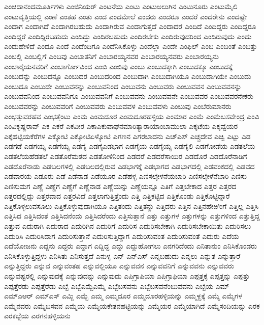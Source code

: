 {ಎಂಚಿದಾನಂದಮೂರ್ತಿಗಳು
ಎಂಜಿನಿಯರ್
ಎಂಟನೆಯ
ಎಂಟು
ಎಂಟುಅಲುಗಿನ
ಎಂಟುನೂರು
ಎಂಟುಮೈಲಿ
ಎಂಟುವೃತ್ತಿಯಲ್ಲಿ
ಎಂಣೆ
ಎಂತಹ
ಎಂತು
ಎಂದ
ಎಂದಮೇಲೆ
ಎಂದರು
ಎಂದರೂ
ಎಂದರೆ
ಎಂದರೇನು
ಎಂದಷ್ಟೇ
ಎಂದಾಗ
ಎಂದಾಗಿದೆ
ಎಂದಾಗಿರಬಹುದು
ಎಂದಾಗಿರುವ
ಎಂದಾಗುತ್ತದೆ
ಎಂದಾದರೆ
ಎಂದಿದೆ
ಎಂದಿದ್ದರು
ಎಂದಿದ್ದರೂ
ಎಂದಿದ್ದರೆ
ಎಂದಿದ್ದಿರಬಹುದು
ಎಂದಿದ್ದು
ಎಂದಿರಬಹುದು
ಎಂದಿರಬೇಕು
ಎಂದಿರುವುದರಿಂದ
ಎಂದಿರುವುದು
ಎಂದು
ಎಂದುಹೇಳಿದೆ
ಎಂದೂ
ಎಂದೆ
ಎಂದೆಂದಿಗೂ
ಎಂದೆನಿಸಿಕೊಳ್ಳು
ಎಂದೆಲ್ಲಾ
ಎಂದೇ
ಎಂಫಿಲ್
ಎಂಬ
ಎಂಬಂತೆ
ಎಂಬತ್ತು
ಎಂಬಲ್ಲಿ
ಎಂಬಲ್ಲಿಗೆ
ಎಂಬವು
ಎಂಬಾತನಿಗೆ
ಎಂಬಾರಯ್ಯನವರ
ಎಂಬಾರಯ್ಯನವರು
ಎಂಬಾರಯ್ಯನು
ಎಂಬಾರೈಯನವರಿಗೆ
ಎಂಬಾರ್ಗೋವಿಂದ
ಎಂಬಿ
ಎಂಬಿವು
ಎಂಬು
ಎಂಬುದಕ್ಕಾಗಿ
ಎಂಬುದಕ್ಕೂ
ಎಂಬುದಕ್ಕೆ
ಎಂಬುದನ್ನು
ಎಂಬುದನ್ನೂ
ಎಂಬುದರ
ಎಂಬುದರಿಂದ
ಎಂಬುದಾಗಿ
ಎಂಬುದಾಗಿಯೂ
ಎಂಬುದಾಗಿಯೇ
ಎಂಬುದು
ಎಂಬುದೂ
ಎಂಬುದೇ
ಎಂಬುವನನ್ನು
ಎಂಬುವನಿಂದ
ಎಂಬುವನು
ಎಂಬುವರು
ಎಂಬುವವನ
ಎಂಬುವವನನ್ನು
ಎಂಬುವವನಿಂದ
ಎಂಬುವವನಿಗೂ
ಎಂಬುವವನಿಗೆ
ಎಂಬುವವನು
ಎಂಬುವವನೇ
ಎಂಬುವವರ
ಎಂಬುವವರನೇಕರು
ಎಂಬುವವರನ್ನು
ಎಂಬುವವರಿಗೆ
ಎಂಬುವವರು
ಎಂಬುವವಳ
ಎಂಬುವವಳು
ಎಂಬುವು
ಎಂಬೆರುಮಾನರು
ಎಂಭತ್ತುವರಹವ
ಎಂಭತ್ತೆಂಟು
ಎಂಮ
ಎಂಮದೂರ
ಎಂಮದೂರಹಳ್ಳಿಯ
ಎಂಮಾರ
ಎಂಮೆ
ಎಂಮೆಬಸವೇಂದ್ರ
ಎಂವಿ
ಎಂವಿಕೃಷ್ಣರಾವ್
ಎಕ
ಎಕರೆ
ಎಕವೀರ
ಎಕಾಎಕುವಾಘನಮಾರಿತ್ಯಾರಾಯಾಂಬಾಮುಲಾ
ಎಕ್ಕಟೆಯ
ಎಕ್ಕವ್ವೆಯರ
ಎಕ್ಕೆಹಟ್ಟಿಯಕೆರೆಗಳ
ಎಕ್ಕೋಟಿ
ಎಕ್ಕೋಟಿಏಳ್ಕೋಟಿ
ಎಗಣನ
ಎಗರಬಾದನು
ಎಚ್ಎಸ್
ಎಚ್ಚದೇವ
ಎಚ್ವಿ
ಎಟ್ಟು
ಎಡ
ಎಡಗಡೆ
ಎಡಗಯ್ಯ
ಎಡಗೆಯ್ಯ
ಎಡಗೈ
ಎಡಗೈಎಡಭಾಗ
ಎಡಗೈಯ
ಎಡಗೈಯ್ಯ
ಎಡಗೈಲಿ
ಎಡಗೋಡೆಯ
ಎಡತಲೆಯ
ಎಡತಲೆಯಹೆಡತಲೆ
ಎಡತೊರೆಮಠದ
ಎಡತೋಳಿನಿಂದ
ಎಡದರೆ
ಎಡದರೆಸಾಯಿರ
ಎಡದೊರೆ
ಎಡದೊರೆನಾಡಿಗೆ
ಎಡದೊರೆನಾಡು
ಎಡಬಲಗಳಲ್ಲಿ
ಎಡಬಲದಲ್ಲಿರುವ
ಎಡಭಾಗಕ್ಕೆ
ಎಡಭಾಗದ
ಎಡಭಾಗದಲ್ಲಿ
ಎಡವಂಕದಲ್ಲಿ
ಎಡವದ
ಎಡವಾರಯ
ಎಡೂರು
ಎಡೆ
ಎಡೆನಾಡ
ಎಡೆಯೂರ
ಎಡೆಹಳ್ಳ
ಎಣಿಸಲ್ಕೇಳನೆಯಬಾರಿ
ಎಣಿಸಲ್ಕೇಳೆನೆಬಾರಿ
ಎಣಿಸು
ಎಣಿಸುಮಗ
ಎಣ್ಣೆ
ಎಣ್ಣೆಗ
ಎಣ್ಣೆಗೆ
ಎಣ್ಣೆನಾಡ
ಎಣ್ಣೆಯನ್ನು
ಎಣ್ಣೆಯನ್ನೂ
ಎತಿಗೆ
ಎತ್ತಬೇಕಾದ
ಎತ್ತರ
ಎತ್ತರದ
ಎತ್ತರದಲ್ಲಿದ್ದು
ಎತ್ತರವಾದ
ಎತ್ತರವಿದೆ
ಎತ್ತಲಾಗುತ್ತಿತ್ತೆಂದು
ಎತ್ತಿ
ಎತ್ತಿಕಟ್ಟಿದ
ಎತ್ತಿಕೊಂಡು
ಎತ್ತಿಕೊಟ್ಟಿದ್ದಾರೆ
ಎತ್ತಿಕೊಳ್ಳಲುವಸೂಲು
ಎತ್ತಿಕೊಳ್ಳುವುದಾಗಿಯೂ
ಎತ್ತಿತಂದು
ಎತ್ತಿತನ್ದು
ಎತ್ತಿದರು
ಎತ್ತಿನ
ಎತ್ತಿನಹೇಱಿಂಗೆ
ಎತ್ತಿಲ್ಲ
ಎತ್ತಿಸಿ
ಎತ್ತಿಸಿದ
ಎತ್ತಿಸಿದಂತೆ
ಎತ್ತಿಸಿದನೆಂದು
ಎತ್ತಿಸಿದರೆಂದು
ಎತ್ತಿಸುತ್ತಾನೆ
ಎತ್ತು
ಎತ್ತುಗಳ
ಎತ್ತುಗಳನ್ನು
ಎತ್ತುಗಳಿಂದ
ಎತ್ತುತ್ತಿದ್ದ
ಎತ್ತುವ
ಎದುರಾಗಿ
ಎದುರಾದ
ಎದುರಿಗಿನ
ಎದುರಿಗೆ
ಎದುರಿಸ
ಎದುರಿಸಬೇಕಾಗಿ
ಎದುರಿಸಬೇಕಾಯಿತು
ಎದುರಿಸಲು
ಎದುರಿಸಿ
ಎದುರಿಸಿದಾಗ
ಎದುರಿಸುತ್ತಾನೆ
ಎದುರಿಸುತ್ತಿದ್ದಾಗ
ಎದುರಿಸುವಂತ
ಎದುರಿಸುವಂತೆ
ಎದುರು
ಎದೆಯ
ಎದೆಯೋಜನು
ಎದ್ದನು
ಎದ್ದರು
ಎದ್ದಾಗ
ಎದ್ದಿದ್ದ
ಎದ್ದು
ಎದ್ದುಹೋಗಲು
ಎನಗರಿದೆಂದು
ಎನಿತಾನುಂ
ಎನಿಸಿಕೊಂಡರು
ಎನಿಸಿಕೊಳ್ಳುತ್ತಿದ್ದಳು
ಎನಿಸಿತು
ಎನಿಸುತ್ತದೆ
ಎನುಳ್ಳ
ಎನ್
ಎನ್ಎಸ್
ಎನ್ನಬಹುದು
ಎನ್ನಲು
ಎನ್ನುತ
ಎನ್ನುತ್ತಾರೆ
ಎನ್ನುತ್ತಿದ್ದರು
ಎನ್ನುವ
ಎನ್ನುವಂತಹ
ಎನ್ನುವಲ್ಲಿಯೂ
ಎನ್ನುವವನ
ಎನ್ನುವವನಿಗೆ
ಎನ್ನುವವನು
ಎನ್ನುವವರು
ಎನ್ನುವಷ್ಟರಲ್ಲಿ
ಎನ್ನುವುದಕ್ಕೆ
ಎನ್ನುವುದನ್ನು
ಎನ್ನುವುದು
ಎಪಿಗ್ರಾಪಿಯಾ
ಎಪಿಗ್ರಾಫಿಯಾ
ಎಪ್ಪತ್ತಕ್ಕೆ
ಎಪ್ಪತ್ತನ್ನು
ಎಪ್ಪತ್ತು
ಎಪ್ಪತ್ತೆರಡು
ಎಪ್ಪತ್ತೆರೆಡು
ಎಬ್ಬೆ
ಎಬ್ಬೆಎಮ್ಬೆಎಮ್ಮೆ
ಎಬ್ಬೆಬಸವನು
ಎಬ್ಬೆಬಸವನೆಂಬುವವನು
ಎಬ್ಬೆಯ
ಎಮ್
ಎಮ್ಎಆರ್
ಎಮ್ಎಸ್
ಎಮ್ಜಿ
ಎಮ್ಬೆ
ಎಮ್ಮ
ಎಮ್ಮದೂರ
ಎಮ್ಮದೂರಹಳ್ಳಿಯನ್ನು
ಎಮ್ಮಳ್ದಕ್ಕೆ
ಎಮ್ಮೆ
ಎಮ್ಮೆಗಳ
ಎಮ್ಮೆನವರು
ಎಮ್ಮೆಬಸವನ
ಎಮ್ಮೆಯ
ಎಮ್ಮೆಯಕೇತನಹಟ್ಟಿಯನ್ನು
ಎಮ್ಮೆಯರ
ಎಮ್ಮೆಯಾಗಿದೆ
ಎಮ್ಮೆಸಂದಿಯನ್ನು
ಎರಕ
ಎರಕಬ್ಬೆಯ
ಎರಗನಹಳ್ಳಿಯನು
}
